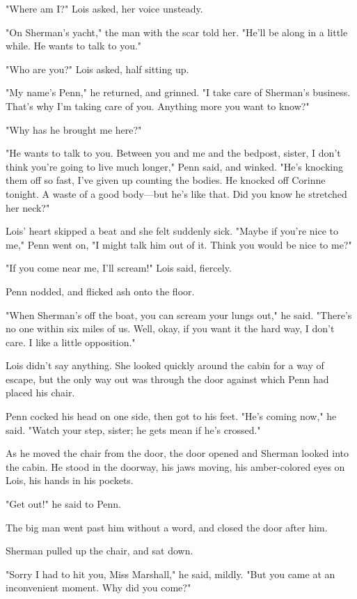 \documentclass{novel}
\begin{document}
"Where am I?" Lois asked, her voice unsteady.

"On Sherman's yacht," the man with the scar told her. "He'll be along in a little while. He wants to talk to you."

"Who are you?" Lois asked, half sitting up.

"My name's Penn," he returned, and grinned. "I take care of Sherman's business. That's why I'm taking care of you. Anything more you want to know?"

"Why has he brought me here?"

"He wants to talk to you. Between you and me and the bedpost, sister, I don't think you're going to live much longer," Penn said, and winked. "He's knocking them off so fast, I've given up counting the bodies. He knocked off Corinne tonight. A waste of a good body—but he's like that. Did you know he stretched her neck?"

Lois' heart skipped a beat and she felt suddenly sick. "Maybe if you're nice to me," Penn went on, "I might talk him out of it. Think you would be nice to me?"

"If you come near me, I'll scream!" Lois said, fiercely.

Penn nodded, and flicked ash onto the floor.

"When Sherman's off the boat, you can scream your lungs out," he said. "There's no one within six miles of us. Well, okay, if you want it the hard way, I don't care. I like a little opposition."

Lois didn't say anything. She looked quickly around the cabin for a way of escape, but the only way out was through the door against which Penn had placed his chair.

Penn cocked his head on one side, then got to his feet. "He's coming now," he said. "Watch your step, sister; he gets mean if he's crossed."

As he moved the chair from the door, the door opened and Sherman looked into the cabin. He stood in the doorway, his jaws moving, his amber-colored eyes on Lois, his hands in his pockets.

"Get out!" he said to Penn.

The big man went past him without a word, and closed the door after him.

Sherman pulled up the chair, and sat down.

"Sorry I had to hit you, Miss Marshall," he said, mildly. "But you came at an inconvenient moment. Why did you come?"
\end{document}
